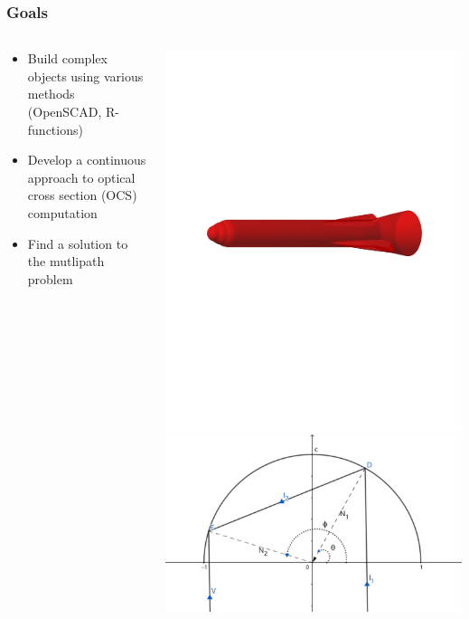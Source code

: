 \documentclass{beamer}
\begin{document}
\begin{frame} 
\frametitle{Goals} 

\begin{columns}
\begin{column}{0.5\textwidth}
\begin{itemize} 
\item Build complex objects using various methods (OpenSCAD, R-functions) 
\item Develop a continuous approach to optical cross section (OCS) computation 
\item Find a solution to the mutlipath problem 
\end{itemize} 
\end{column}
\begin{column}{0.5\textwidth}
\includegraphics[width = 0.6\linewidth]{rocket.pdf}\\ 
\vspace{5mm}
\includegraphics[width = 0.6\linewidth]{./figs/multipath.pdf} 
\end{column}
\end{columns}

\end{frame} 
\end{document}
